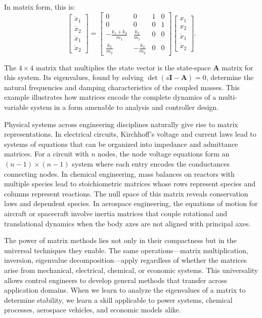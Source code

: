 In matrix form, this is:
\[
\begin{bmatrix} \dot{x}_1 \\ \dot{x}_2 \\ \ddot{x}_1 \\ \ddot{x}_2 \end{bmatrix} =
\begin{bmatrix}
0 & 0 & 1 & 0 \\
0 & 0 & 0 & 1 \\
-\frac{k_1+k_2}{m_1} & \frac{k_2}{m_1} & 0 & 0 \\
\frac{k_2}{m_2} & -\frac{k_2}{m_2} & 0 & 0
\end{bmatrix}
\begin{bmatrix} x_1 \\ x_2 \\ \dot{x}_1 \\ \dot{x}_2 \end{bmatrix}.
\]

The $4 \times 4$ matrix that multiplies the state vector is the state-space $\mathbf{A}$ matrix for this system. Its eigenvalues, found by solving $\det(s\mathbf{I} - \mathbf{A}) = 0$, determine the natural frequencies and damping characteristics of the coupled masses. This example illustrates how matrices encode the complete dynamics of a multi-variable system in a form amenable to analysis and controller design.

Physical systems across engineering disciplines naturally give rise to matrix representations. In electrical circuits, Kirchhoff's voltage and current laws lead to systems of equations that can be organized into impedance and admittance matrices. For a circuit with $n$ nodes, the node voltage equations form an $(n-1) \times (n-1)$ system where each entry encodes the conductances connecting nodes. In chemical engineering, mass balances on reactors with multiple species lead to stoichiometric matrices whose rows represent species and columns represent reactions. The null space of this matrix reveals conservation laws and dependent species. In aerospace engineering, the equations of motion for aircraft or spacecraft involve inertia matrices that couple rotational and translational dynamics when the body axes are not aligned with principal axes.

The power of matrix methods lies not only in their compactness but in the universal techniques they enable. The same operations---matrix multiplication, inversion, eigenvalue decomposition---apply regardless of whether the matrices arise from mechanical, electrical, chemical, or economic systems. This universality allows control engineers to develop general methods that transfer across application domains. When we learn to analyze the eigenvalues of a matrix to determine stability, we learn a skill applicable to power systems, chemical processes, aerospace vehicles, and economic models alike.

